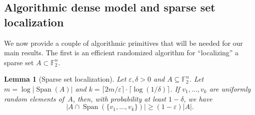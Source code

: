 \documentclass[11pt]{amsart}
\newcommand{\F}{\mathbb{F}} %
\DeclareMathOperator{\vspan}{Span} %
\theoremstyle{plain}
\newtheorem{lemma}[theorem]{Lemma}
\theoremstyle{definition}
\theoremstyle{remark}
\begin{document}
\subsection{Algorithmic dense model and sparse set localization}
\label{sec:lemmas}

We now provide a couple of algorithmic primitives that will be needed for our main results.
The first is an efficient randomized algorithm for ``localizing'' a sparse set $A \subset \F_2^n$.

\begin{lemma}[Sparse set localization]
\label{lem:spansample}
   Let $\varepsilon, \delta >0$ and $A \subseteq \F_2^n$.
   Let $m = \log |\vspan(A)|$ and $k = \lceil 2m/\varepsilon\rceil \cdot \lceil\log(1/\delta)\rceil$.
    If $v_1, \dots, v_k$ are uniformly random elements of~$A$, then, with probability at least $1-\delta$, we have
    $$|A\cap \vspan(\{v_1, \dots, v_k\})| \geq (1-\varepsilon)|A|.$$
\end{lemma}
\end{document}
